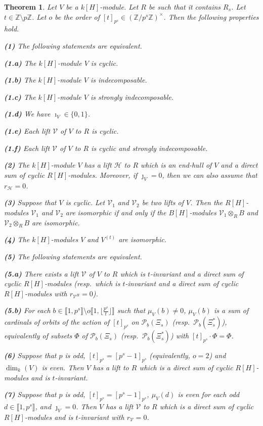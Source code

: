 \documentclass[11pt]{amsart}
\newtheorem{theorem}{Theorem}[section]
\begin{document}
\begin{theorem}\label{T3} 
Let $V$ be a $k[H]$-module. Let $R$ be such that it contains $R_s$. Let $t\in\mathbb Z\setminus p\mathbb Z$. Let $o$ be the order of $[t]_{p^s}\in (\mathbb Z/p^s\mathbb Z)^{\times}$. Then the following properties hold.

\medskip
{\bf (1)} The following statements are equivalent.

\medskip\noindent
{\bf (1.a)} The $k[H]$-module $V$ is cyclic.

\smallskip\noindent
{\bf (1.b)} The $k[H]$-module $V$ is indecomposable.

\smallskip\noindent
{\bf (1.c)} The $k[H]$-module $V$ is strongly indecomposable.

\smallskip\noindent
{\bf (1.d)} We have $\imath_V\in\{0,1\}$.

\smallskip\noindent
{\bf (1.e)} Each lift $\mathcal V$ of $V$ to $R$ is cyclic.

\smallskip\noindent
{\bf (1.f)} Each lift $\mathcal V$ of $V$ to $R$ is cyclic and strongly indecomposable.

\medskip
{\bf (2)} The $k[H]$-module $V$ has a lift $\mathcal H$ to $R$ which is an end-hull of $V$ and a direct sum of cyclic $R[H]$-modules. Moreover, if $\jmath_V=0$, then we can also assume that $r_{\mathcal H}=0$.

\smallskip
{\bf (3)} Suppose that $V$ is cyclic. Let $\mathcal V_1$ and $\mathcal V_2$ be two lifts of $V$. Then the $R[H]$-modules $\mathcal V_1$ and $\mathcal V_2$ are isomorphic if and only if the $B[H]$-modules $\mathcal V_1\otimes_R B$ and $\mathcal V_2\otimes_R B$ are isomorphic.

\smallskip
{\bf (4)} The $k[H]$-modules $V$ and $V^{(t)}$ are isomorphic.

\smallskip
{\bf (5)} The following statements are equivalent.

\medskip\noindent
{\bf (5.a)} There exists a lift $\mathcal V$ of $V$ to $R$ which is $t$-invariant and a direct sum of cyclic $R[H]$-modules (resp.\ which is $t$-invariant and a direct sum of cyclic $R[H]$-modules with $r_{\mathcal V^H}=0$).

\smallskip\noindent
{\bf (5.b)} For each $b\in\llbracket1,p^s\rrbracket\setminus o\llbracket1,\lfloor\frac{p^s}{t}\rfloor\rrbracket$ such that $\mu_V(b)\neq 0$, $\mu_V(b)$ is a sum of cardinals of orbits of the action of $[t]_{p^s}$ on $\mathcal P_b(\Xi_s)$ (resp.\ $\mathcal P_b(\Xi_s^{\ast})$), equivalently of subsets $\Phi$ of $\mathcal P_b(\Xi_s)$ (resp.\ $\mathcal P_b(\Xi_s^{\ast})$) with $[t]_{p^s}\cdot\Phi=\Phi$.

\medskip
{\bf (6)} Suppose that $p$ is odd, $[t]_{p^s}=[p^s-1]_{p^s}$ (equivalently, $o=2$) and $\dim_k(V)$ is even. Then $V$ has a lift to $R$ which is a direct sum of cyclic $R[H]$-modules and is $t$-invariant.

\medskip
{\bf (7)} Suppose that $p$ is odd, $[t]_{p^s}=[p^s-1]_{p^s}$, $\mu_V(d)$ is even for each odd $d\in\llbracket1,p^s\rrbracket$, and $\jmath_V=0$. Then $V$ has a lift $\mathcal V$ to $R$ which is a direct sum of cyclic $R[H]$-modules and is $t$-invariant with $r_{\mathcal V}=0$.
\end{theorem}%
\end{document}
